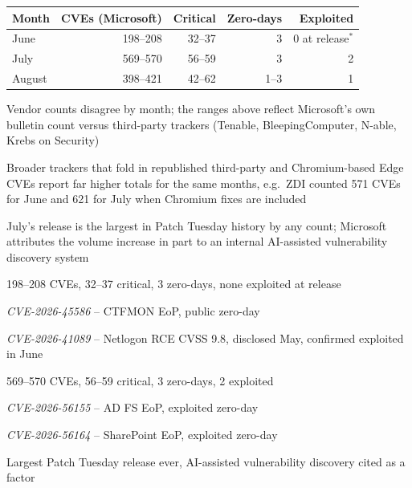 \documentclass[Screen16to9,17pt]{foils}
\begin{document}

\begin{tabularx}{23cm}{Xrrrr}
Month & CVEs (Microsoft) & Critical & Zero-days & Exploited \\
\hline
June  & 198--208  & 32--37 & 3 & 0 at release$^{*}$ \\
July  & 569--570  & 56--59 & 3 & 2 \\
August & 398--421 & 42--62 & 1--3 & 1 \\
\end{tabularx}

\begin{list2}
\item Vendor counts disagree by month; the ranges above reflect Microsoft's own bulletin count versus third-party trackers (Tenable, BleepingComputer, N-able, Krebs on Security)
\item Broader trackers that fold in republished third-party and Chromium-based Edge CVEs report far higher totals for the same months, e.g.\ ZDI counted 571 CVEs for June and 621 for July when Chromium fixes are included
\item July's release is the largest in Patch Tuesday history by any count; Microsoft attributes the volume increase in part to an internal AI-assisted vulnerability discovery system
\end{list2}

\begin{list2}
\item 198--208 CVEs, 32--37 critical, 3 zero-days, none exploited at release
\item \emph{CVE-2026-45586} -- CTFMON EoP, public zero-day
\item \emph{CVE-2026-41089} -- Netlogon RCE CVSS 9.8, disclosed May, confirmed exploited in June
\end{list2}

\begin{list2}
\item 569--570 CVEs, 56--59 critical, 3 zero-days, 2 exploited
\item \emph{CVE-2026-56155} -- AD FS EoP, exploited zero-day
\item \emph{CVE-2026-56164} -- SharePoint EoP, exploited zero-day
\item Largest Patch Tuesday release ever, AI-assisted vulnerability discovery cited as a factor
\end{list2}
\end{document}
